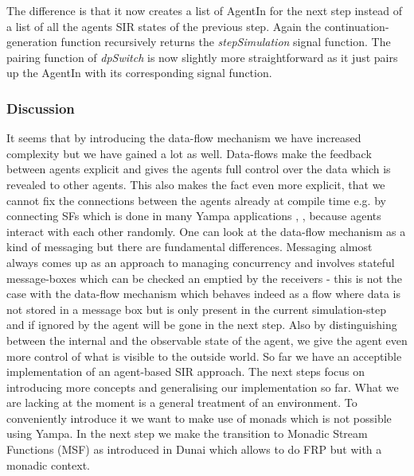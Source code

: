 The difference is that it now creates a list of AgentIn for the next step instead of a list of all the agents SIR states of the previous step. Again the continuation-generation function recursively returns the \textit{stepSimulation} signal function. The pairing function of \textit{dpSwitch} is now slightly more straightforward as it just pairs up the AgentIn with its corresponding signal function. 

\subsubsection{Discussion}
It seems that by introducing the data-flow mechanism we have increased complexity but we have gained a lot as well. Data-flows make the feedback between agents explicit and gives the agents full control over the data which is revealed to other agents. This also makes the fact even more explicit, that we cannot fix the connections between the agents already at compile time e.g. by connecting SFs which is done in many Yampa applications \cite{nilsson_functional_2002}, \cite{courtney_yampa_2003}, \cite{nilsson_declarative_2014} because agents interact with each other randomly. One can look at the data-flow mechanism as a kind of messaging but there are fundamental differences. Messaging almost always comes up as an approach to managing concurrency and involves stateful message-boxes which can be checked an emptied by the receivers - this is not the case with the data-flow mechanism which behaves indeed as a flow where data is not stored in a message box but is only present in the current simulation-step and if ignored by the agent will be gone in the next step.
Also by distinguishing between the internal and the observable state of the agent, we give the agent even more control of what is visible to the outside world.
So far we have an acceptible implementation of an agent-based SIR approach. The next steps focus on introducing more concepts and generalising our implementation so far. What we are lacking at the moment is a general treatment of an environment. To conveniently introduce it we want to make use of monads which is not possible using Yampa. In the next step we make the transition to Monadic Stream Functions (MSF) as introduced in Dunai \cite{perez_functional_2016} which allows to do FRP but with a monadic context.